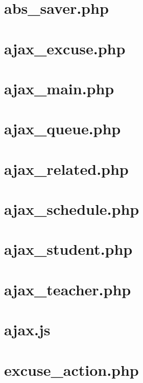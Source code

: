\documentclass[12pt,a4paper,twoside,openany]{report}
\begin{document}
\newpage\section{abs\_saver.php}


\newpage\section{ajax\_excuse.php}


\newpage\section{ajax\_main.php}


\newpage\section{ajax\_queue.php}


\newpage\section{ajax\_related.php}


\newpage\section{ajax\_schedule.php}


\newpage\section{ajax\_student.php}


\newpage\section{ajax\_teacher.php}


\newpage\section{ajax.js}


\newpage\section{excuse\_action.php}

\end{document}
